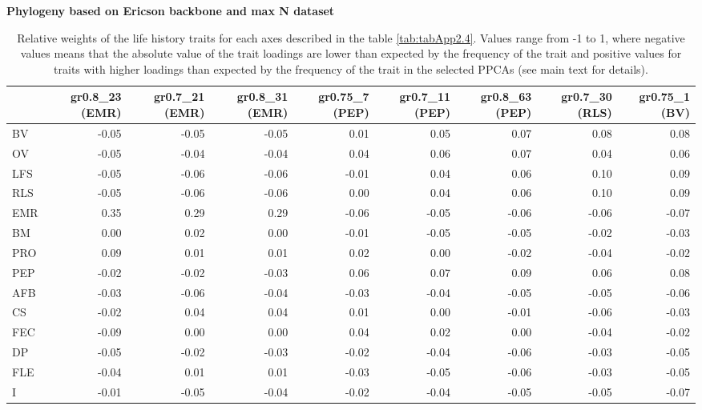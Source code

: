 \clearpage%
\begin{landscape}%
\begin{table}
\center
\caption[LHT relative importance of the alternative axes]{
Relative weights of the life history traits for each axes described in the
table \ref{tab:tabApp2.4}. Values range from -1 to 1, where negative values
means that the absolute value of the trait loadings are lower than expected by
the frequency of the trait and positive values for traits with higher loadings
than expected by the frequency of the trait in the selected PPCAs (see main
text for details).
}
\label{tab:tabApp2.6}
\begin{footnotesize}

\textbf{Phylogeny based on Ericson backbone and max N dataset}

\begin{tabular}{@{}l|rrrrrrrr@{}}
\toprule
  & gr0.8\_23 (EMR) & gr0.7\_21 (EMR) & gr0.8\_31 (EMR) & gr0.75\_7 (PEP) & gr0.7\_11 (PEP) & gr0.8\_63 (PEP) & gr0.7\_30 (RLS) & gr0.75\_1 (BV)\\
\midrule
BV & -0.05 & -0.05 & -0.05 & 0.01 & 0.05 & 0.07 & 0.08 & 0.08\\
OV & -0.05 & -0.04 & -0.04 & 0.04 & 0.06 & 0.07 & 0.04 & 0.06\\
LFS & -0.05 & -0.06 & -0.06 & -0.01 & 0.04 & 0.06 & 0.10 & 0.09\\
RLS & -0.05 & -0.06 & -0.06 & 0.00 & 0.04 & 0.06 & 0.10 & 0.09\\
EMR & 0.35 & 0.29 & 0.29 & -0.06 & -0.05 & -0.06 & -0.06 & -0.07\\
BM & 0.00 & 0.02 & 0.00 & -0.01 & -0.05 & -0.05 & -0.02 & -0.03\\
PRO & 0.09 & 0.01 & 0.01 & 0.02 & 0.00 & -0.02 & -0.04 & -0.02\\
PEP & -0.02 & -0.02 & -0.03 & 0.06 & 0.07 & 0.09 & 0.06 & 0.08\\
AFB & -0.03 & -0.06 & -0.04 & -0.03 & -0.04 & -0.05 & -0.05 & -0.06\\
CS & -0.02 & 0.04 & 0.04 & 0.01 & 0.00 & -0.01 & -0.06 & -0.03\\
FEC & -0.09 & 0.00 & 0.00 & 0.04 & 0.02 & 0.00 & -0.04 & -0.02\\
DP & -0.05 & -0.02 & -0.03 & -0.02 & -0.04 & -0.06 & -0.03 & -0.05\\
FLE & -0.04 & 0.01 & 0.01 & -0.03 & -0.05 & -0.06 & -0.03 & -0.05\\
I & -0.01 & -0.05 & -0.04 & -0.02 & -0.04 & -0.05 & -0.05 & -0.07\\
\bottomrule
\end{tabular}


\end{footnotesize}
\end{table}
\end{landscape}
